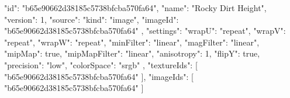 {
  "id": "b65e90662d38185c5738bfcba570fa64",
  "name": "Rocky Dirt Height",
  "version": 1,
  "source": {
    "kind": "image",
    "imageId": "b65e90662d38185c5738bfcba570fa64"
  },
  "settings": {
    "wrapU": "repeat",
    "wrapV": "repeat",
    "wrapW": "repeat",
    "minFilter": "linear",
    "magFilter": "linear",
    "mipMap": true,
    "mipMapFilter": "linear",
    "anisotropy": 1,
    "flipY": true,
    "precision": "low",
    "colorSpace": "srgb"
  },
  "textureIds": [
    "b65e90662d38185c5738bfcba570fa64"
  ],
  "imageIds": [
    "b65e90662d38185c5738bfcba570fa64"
  ]
}
